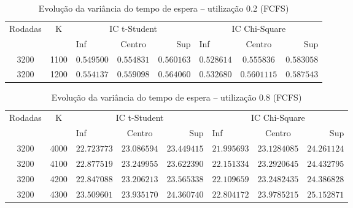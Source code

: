 \documentclass[a4paper]{article}
\begin{document}
\begin{table}[h!]
    \centering
    \begin{tabular}{|c|c|lcr|lcr|}\hline
        \multirow{2}{3.75em}{Rodadas}
            & \multirow{2}{1em}{K}
            & \multicolumn{3}{|c|}{IC t-Student}
            & \multicolumn{3}{|c|}{IC Chi-Square} \\
        && Inf & Centro & Sup & Inf & Centro & Sup \\\hline
        3200 & 1100
            &$ 0.549500 $&$ 0.554831 $&$ 0.560163 $
            &$ 0.528614 $&$ 0.555836 $&$ 0.583058 $\\\hline
        3200 & 1200
            &$ 0.554137 $&$ 0.559098 $&$ 0.564060 $
            &$ 0.532680 $&$ 0.5601115 $&$ 0.587543 $\\\hline
    \end{tabular}
    \caption{Evolução da variância do tempo de espera --
        utilização 0.2 (FCFS)}
\end{table}

\begin{table}[h!]
    \centering
    \begin{tabular}{|c|c|lcr|lcr|}\hline
        \multirow{2}{3.75em}{Rodadas}
            & \multirow{2}{1em}{K}
            & \multicolumn{3}{|c|}{IC t-Student}
            & \multicolumn{3}{|c|}{IC Chi-Square} \\
        && Inf & Centro & Sup & Inf & Centro & Sup \\\hline
        3200 & 4000
            &$ 22.723773 $&$ 23.086594 $&$ 23.449415 $
            &$ 21.995693 $&$ 23.1284085 $&$ 24.261124 $\\\hline
        3200 & 4100
            &$ 22.877519 $&$ 23.249955 $&$ 23.622390 $
            &$ 22.151334 $&$ 23.2920645 $&$ 24.432795 $\\\hline
        3200 & 4200
            &$ 22.847088 $&$ 23.206213 $&$ 23.565338 $
            &$ 22.109659 $&$ 23.2482435 $&$ 24.386828 $\\\hline
        3200 & 4300
            &$ 23.509601 $&$ 23.935170 $&$ 24.360740 $
            &$ 22.804172 $&$ 23.9785215 $&$ 25.152871 $\\\hline
    \end{tabular}
    \caption{Evolução da variância do tempo de espera --
        utilização 0.8 (FCFS)}
\end{table}
\end{document}
